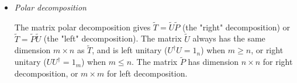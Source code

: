 \documentclass[11pt]{article}
\begin{document}
\begin{itemize}
\item \emph{Polar decomposition}

The matrix polar decomposition gives $\tilde{T} = \tilde{U} \tilde{P}$ (the "right" decomposition) or $\tilde{T} = \tilde{P} \tilde{U}$ (the "left" decomposition). 
The matrix $\tilde{U}$ always has the same dimension $m \times n$ as $\tilde{T}$, 
and is left unitary ($U^\dagger U = 1_n$) when $m \ge n$, 
or right unitary ($U U^\dagger = 1_m$) when $m \le n$. 
The matrix $\tilde{P}$ has dimension $n \times n$ for right decomposition, or $m \times m$ for left decomposition. 

\end{itemize}
\endgroup



\end{document}
